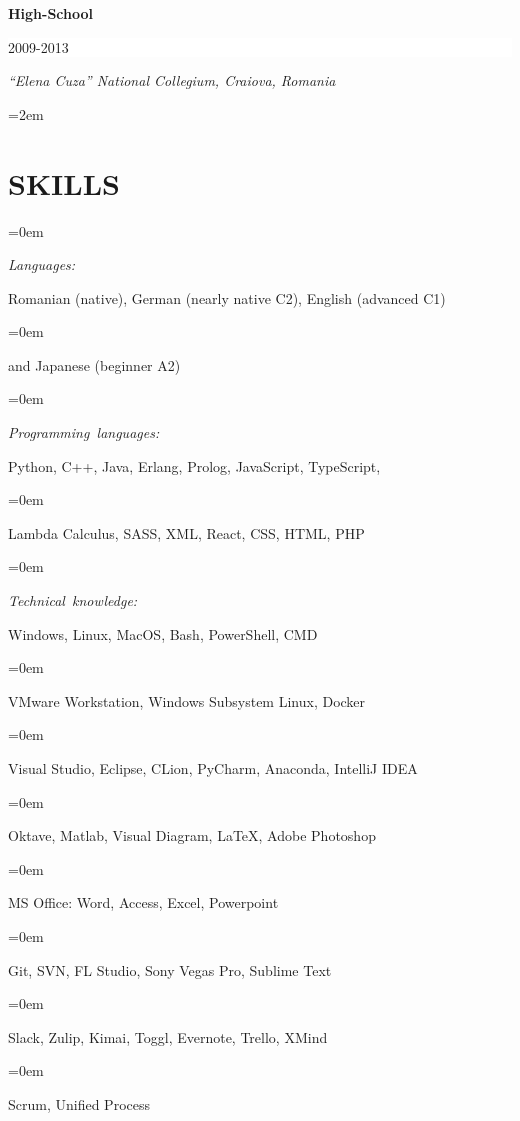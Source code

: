 \documentclass[paper=a4,fontsize=10.9pt]{scrartcl} %
\newlength{\spacebox}
\newcommand{\sepspace}{\vspace*{0.5em}}		%
\newcommand{\NewPart}[1]{\section*{\uppercase{#1}}}
\newcommand{\PersonalEntry}[2]{
		\noindent\hangindent=0em\hangafter=0 %
		\parbox{\spacebox}{        %
		\mbox {\textit{#1}}}		       %
		\hspace{5em} #2 \par}    %
\newcommand{\SkillsEntry}[2]{      %
		\noindent\hangindent=0em\hangafter=0 %
		\parbox{\spacebox}{        %
		\mbox{\textit{#1}}}			   %
		\hspace{6em} #2 \par}    %
\newcommand{\EducationEntry}[4]{
		\noindent \textbf{#1} \hfill      %
		\colorbox{White}{%
			\parbox{16em}{%
			\hfill\color{Black}#2}} \par  %
		\noindent \textit{#3} \par        %
		\noindent\hangindent=2em\hangafter=0 \small #4 %
		\normalsize \par}
\begin{document}

\EducationEntry{\color[HTML]{6a040f}High-School}{2009-2013}{“Elena Cuza” National Collegium, Craiova, Romania}{%
}





\NewPart{Skills}{}

\SkillsEntry{Languages:}{Romanian (native), German (nearly native C2), English (advanced C1) }
\SkillsEntry{}{and Japanese (beginner A2)}

\sepspace

\SkillsEntry{Programming languages:}{Python, C++, Java, Erlang, Prolog, JavaScript, TypeScript,}
\SkillsEntry{}{Lambda Calculus, SASS, XML, React, CSS, HTML, PHP}

\sepspace

\SkillsEntry{Technical knowledge:}{Windows, Linux, MacOS, Bash, PowerShell, CMD} 
\SkillsEntry{}{VMware Workstation, Windows Subsystem Linux, Docker}
\SkillsEntry{}{Visual Studio, Eclipse, CLion, PyCharm, Anaconda, IntelliJ IDEA}

\SkillsEntry{}{Oktave, Matlab, Visual Diagram, \LaTeX, Adobe Photoshop}
\SkillsEntry{}{MS Office: Word, Access, Excel, Powerpoint}
\SkillsEntry{}{Git, SVN, FL Studio, Sony Vegas Pro, Sublime Text}
\SkillsEntry{}{Slack, Zulip, Kimai, Toggl, Evernote, Trello, XMind}
\SkillsEntry{}{Scrum, Unified Process}



%
\end{document}
